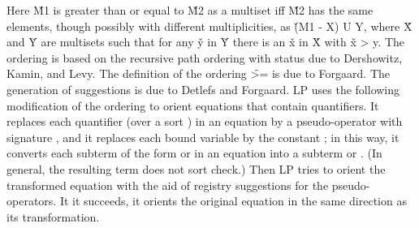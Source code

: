 Here \v{M1} is greater than or equal to \v{M2} as a multiset iff \v{M2} has the
same elements, though possibly with different multiplicities, as 
\v{(M1 - X) U Y}, where \v{X} and \v{Y} are multisets such that for any \v{y} 
in \v{Y} there is an \v{x} in \v{X} with \v{x > y}.
\p
The  ordering is based on the recursive path ordering with status
due to Dershowitz, Kamin, and Levy.  The definition of the ordering \f{>=} is
due to Forgaard.  The generation of suggestions is due to Detlefs and Forgaard.
\p
LP uses the following modification of the  ordering to orient
equations that contain quantifiers.  It replaces each quantifier (over a sort
) in an equation by a pseudo-operator with signature
, and it replaces each bound variable by the constant 
; in this way, it converts each subterm of the form  or 
 in an equation into a subterm  or 
.  (In general, the resulting term does not 
sort check.)  Then LP tries to orient the transformed equation with the aid of
registry suggestions for the pseudo-operators.  It it succeeds, it orients the
original equation in the same direction as its transformation.
